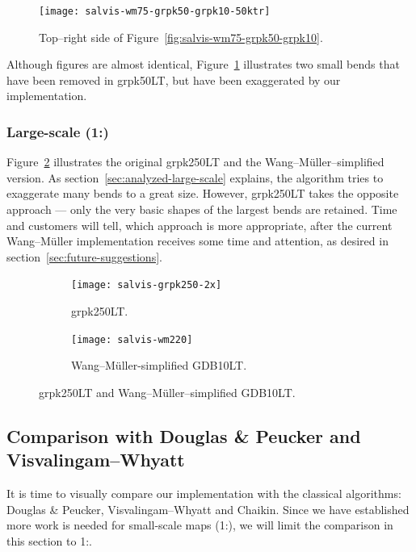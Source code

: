 \documentclass[a4paper]{article}
\newcommand{\DP}{Douglas \& Peucker}
\newcommand{\VW}{Visvalingam--Whyatt}
\newcommand{\WM}{Wang--M{\"u}ller}
\begin{document}
\begin{figure}[h!]
    \centering
    \texttt{[image: salvis-wm75-grpk50-grpk10-50ktr]}
    \caption{Top--right side of Figure~\ref{fig:salvis-wm75-grpk50-grpk10}.}
    \label{fig:salvis-wm75-grpk50-grpk10-50ktr}
\end{figure}

Although figures are almost identical, Figure~\ref{fig:salvis-wm75-grpk50-grpk10-50ktr}
illustrates two small bends that have been removed in grpk50LT, but have been
exaggerated by our implementation.

\subsubsection{Large-scale (1:)}
\label{sec:national-large-scale}

Figure~\ref{fig:salvis-wm220} illustrates the original grpk250LT and the
{\WM}--simplified version. As section~\ref{sec:analyzed-large-scale} explains,
the algorithm tries to exaggerate many bends to a great size. However, grpk250LT
takes the opposite approach --- only the very basic shapes of the largest bends
are retained. Time and customers will tell, which approach is more appropriate,
after the current {\WM} implementation receives some time and attention, as
desired in section~\ref{sec:future-suggestions}.

\begin{figure}[h!]
    \centering
    \begin{subfigure}[b]{.49\textwidth}
        \texttt{[image: salvis-grpk250-2x]}
        \caption{grpk250LT.}
    \end{subfigure}
    \hfill
    \begin{subfigure}[b]{.49\textwidth}
        \centering
        \texttt{[image: salvis-wm220]}
        \caption{{\WM}-simplified GDB10LT.}
    \end{subfigure}
    \caption{grpk250LT and {\WM}--simplified GDB10LT.}
    \label{fig:salvis-wm220}
\end{figure}


\subsection{Comparison with {\DP} and {\VW}}

It is time to visually compare our implementation with the classical
algorithms: {\DP}, {\VW} and Chaikin. Since we have established more work is
needed for small-scale maps (1:), we will limit the comparison
in this section to 1:.
\end{document}
